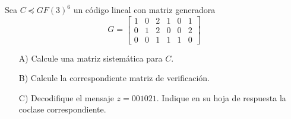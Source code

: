 
Sea $C \preceq GF(3)^6$ un código lineal con matriz generadora
\begin{equation*}
    G = \begin{bmatrix} 1 & 0 & 2 & 1 & 0 & 1 \\ 0 & 1 & 2 & 0 & 0 & 2 \\ 0 & 0 & 1 & 1 & 1 & 0 \end{bmatrix}
\end{equation*}

\begin{itemize}
    \item[A)] Calcule una matriz sistemática para $C$.
    \item[B)] Calcule la correspondiente matriz de verificación.
    \item[C)] Decodifique el mensaje $z = 001021$. Indique en su hoja de respuesta la coclase correspondiente.
\end{itemize}
